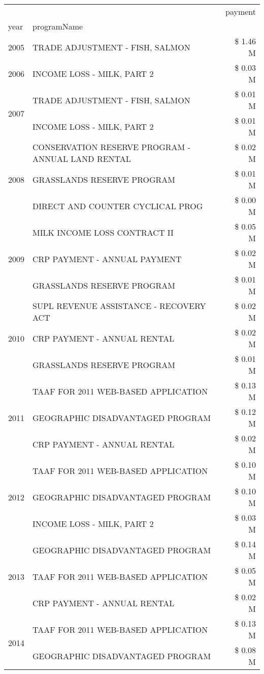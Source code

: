 \begin{tabular}{llr}
\toprule
 &  & payment \\
year & programName &  \\
\midrule
2005 & TRADE ADJUSTMENT - FISH, SALMON & \$ 1.46 M \\
\cline{1-3}
2006 & INCOME LOSS - MILK, PART 2 & \$ 0.03 M \\
\cline{1-3}
\multirow[t]{2}{*}{2007} & TRADE ADJUSTMENT - FISH, SALMON & \$ 0.01 M \\
 & INCOME LOSS - MILK, PART 2 & \$ 0.01 M \\
\cline{1-3}
\multirow[t]{3}{*}{2008} & CONSERVATION RESERVE PROGRAM - ANNUAL LAND RENTAL & \$ 0.02 M \\
 & GRASSLANDS RESERVE PROGRAM & \$ 0.01 M \\
 & DIRECT AND COUNTER CYCLICAL PROG & \$ 0.00 M \\
\cline{1-3}
\multirow[t]{3}{*}{2009} & MILK INCOME LOSS CONTRACT II & \$ 0.05 M \\
 & CRP PAYMENT - ANNUAL PAYMENT & \$ 0.02 M \\
 & GRASSLANDS RESERVE PROGRAM & \$ 0.01 M \\
\cline{1-3}
\multirow[t]{3}{*}{2010} & SUPL REVENUE ASSISTANCE - RECOVERY ACT & \$ 0.02 M \\
 & CRP PAYMENT - ANNUAL RENTAL & \$ 0.02 M \\
 & GRASSLANDS RESERVE PROGRAM & \$ 0.01 M \\
\cline{1-3}
\multirow[t]{3}{*}{2011} & TAAF FOR 2011 WEB-BASED APPLICATION & \$ 0.13 M \\
 & GEOGRAPHIC DISADVANTAGED PROGRAM & \$ 0.12 M \\
 & CRP PAYMENT - ANNUAL RENTAL & \$ 0.02 M \\
\cline{1-3}
\multirow[t]{3}{*}{2012} & TAAF FOR 2011 WEB-BASED APPLICATION & \$ 0.10 M \\
 & GEOGRAPHIC DISADVANTAGED PROGRAM & \$ 0.10 M \\
 & INCOME LOSS - MILK, PART 2 & \$ 0.03 M \\
\cline{1-3}
\multirow[t]{3}{*}{2013} & GEOGRAPHIC DISADVANTAGED PROGRAM & \$ 0.14 M \\
 & TAAF FOR 2011 WEB-BASED APPLICATION & \$ 0.05 M \\
 & CRP PAYMENT - ANNUAL RENTAL & \$ 0.02 M \\
\cline{1-3}
\multirow[t]{3}{*}{2014} & TAAF FOR 2011 WEB-BASED APPLICATION & \$ 0.13 M \\
 & GEOGRAPHIC DISADVANTAGED PROGRAM & \$ 0.08 M \\

\end{tabular}

